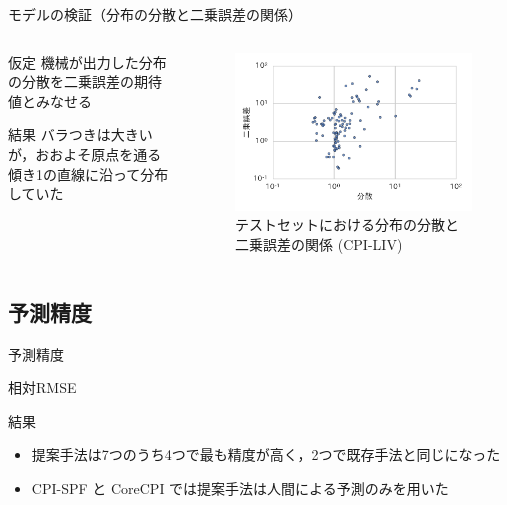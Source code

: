 \documentclass[dvipdfmx,aspectratio=169]{beamer}
\begin{document}
\begin{frame}{モデルの検証（分布の分散と二乗誤差の関係）}
\begin{columns}
  \begin{column}{0.4\textwidth}
    \begin{block}{仮定}
      機械が出力した分布の分散を二乗誤差の期待値とみなせる
    \end{block}
    \begin{alertblock}{結果}
      バラつきは大きいが，おおよそ原点を通る傾き1の直線に沿って分布していた
    \end{alertblock}
  \end{column}
  \begin{column}{0.6\textwidth}
    \begin{figure}
      \includegraphics[width=\columnwidth]{slide-var_sqerr.pdf}
      \caption{テストセットにおける分布の分散と二乗誤差の関係 (CPI-LIV)}
    \end{figure}
  \end{column}
\end{columns}
\end{frame}

\subsection{予測精度}

\begin{frame}{予測精度}
\begin{table}
  \caption{相対RMSE}
  \begin{center}
    \small
    
  \end{center}
\end{table}
\begin{alertblock}{結果}
  \begin{itemize}
    \item \alert{提案手法は7つのうち4つで最も精度が高く，2つで既存手法と同じになった}
    \item CPI-SPF と CoreCPI では提案手法は人間による予測のみを用いた
  \end{itemize}
\end{alertblock}
\end{frame}
\end{document}
